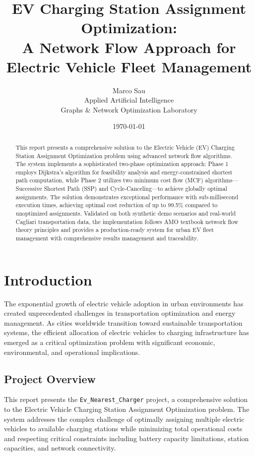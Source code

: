 \documentclass[12pt,a4paper]{article}
\title{\textbf{EV Charging Station Assignment Optimization:\\A Network Flow Approach for Electric Vehicle Fleet Management}}
\author{Marco Sau\\Applied Artificial Intelligence\\Graphs \& Network Optimization Laboratory}
\date{\today}
\begin{document}
\maketitle

\begin{abstract}
This report presents a comprehensive solution to the Electric Vehicle (EV) Charging Station Assignment Optimization problem using advanced network flow algorithms. The system implements a sophisticated two-phase optimization approach: Phase 1 employs Dijkstra's algorithm for feasibility analysis and energy-constrained shortest path computation, while Phase 2 utilizes two minimum cost flow (MCF) algorithms—Successive Shortest Path (SSP) and Cycle-Canceling—to achieve globally optimal assignments. The solution demonstrates exceptional performance with sub-millisecond execution times, achieving optimal cost reduction of up to 99.5\% compared to unoptimized assignments. Validated on both synthetic demo scenarios and real-world Cagliari transportation data, the implementation follows AMO textbook network flow theory principles and provides a production-ready system for urban EV fleet management with comprehensive results management and traceability.
\end{abstract}

\tableofcontents
\newpage

\section{Introduction}

The exponential growth of electric vehicle adoption in urban environments has created unprecedented challenges in transportation optimization and energy management. As cities worldwide transition toward sustainable transportation systems, the efficient allocation of electric vehicles to charging infrastructure has emerged as a critical optimization problem with significant economic, environmental, and operational implications.

\subsection{Project Overview}

This report presents the \texttt{Ev\_Nearest\_Charger} project, a comprehensive solution to the Electric Vehicle Charging Station Assignment Optimization problem. The system addresses the complex challenge of optimally assigning multiple electric vehicles to available charging stations while minimizing total operational costs and respecting critical constraints including battery capacity limitations, station capacities, and network connectivity.
\end{document}
